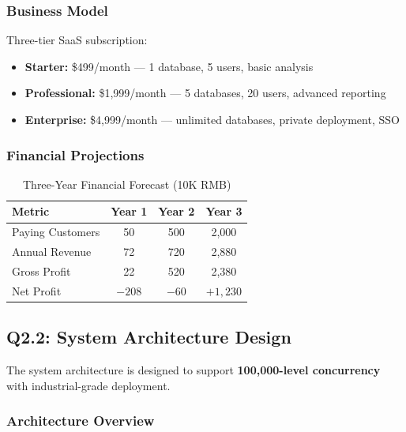 \documentclass[12pt,a4paper]{article}
\begin{document}
\subsubsection{Business Model}

Three-tier SaaS subscription:
\begin{itemize}[leftmargin=*]
    \item \textbf{Starter:} \$499/month — 1 database, 5 users, basic analysis
    \item \textbf{Professional:} \$1,999/month — 5 databases, 20 users, advanced reporting
    \item \textbf{Enterprise:} \$4,999/month — unlimited databases, private deployment, SSO
\end{itemize}

\subsubsection{Financial Projections}

\begin{table}[H]
\centering
\caption{Three-Year Financial Forecast (10K RMB)}
\begin{tabular}{lccc}
\toprule
\textbf{Metric} & \textbf{Year 1} & \textbf{Year 2} & \textbf{Year 3} \\
\midrule
Paying Customers & 50 & 500 & 2,000 \\
Annual Revenue & 72 & 720 & 2,880 \\
Gross Profit & 22 & 520 & 2,380 \\
Net Profit & $-208$ & $-60$ & $+1,230$ \\
\bottomrule
\end{tabular}
\end{table}

\subsection{Q2.2: System Architecture Design}

The system architecture is designed to support \textbf{100,000-level concurrency} with industrial-grade deployment.

\subsubsection{Architecture Overview}
\end{document}
